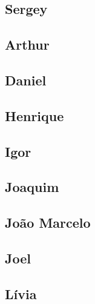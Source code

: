 \subsection{Sergey}

\subsection{Arthur}

\subsection{Daniel}

\subsection{Henrique}

\subsection{Igor}

\subsection{Joaquim}

\subsection{João Marcelo}

\subsection{Joel}

\subsection{Lívia}

